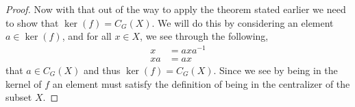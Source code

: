 \documentclass[10pt]{article}
\begin{document}
\begin{proof}
    Now with that out of the way to apply the theorem stated earlier we need to show that $\ker(f) = C_G(X)$. We will do this by considering an element $a\in \ker(f)$, and for all $x\in X$, we see through the following,
    \begin{align*}
        x &= axa^{-1} \\
        xa &= ax
    \end{align*}
    that $a\in C_G(X)$ and thus $\ker(f) = C_G(X)$. Since we see by being in the kernel of $f$ an element must satisfy the definition of being in the centralizer of the subset $X$. 

\end{proof}
\end{document}

